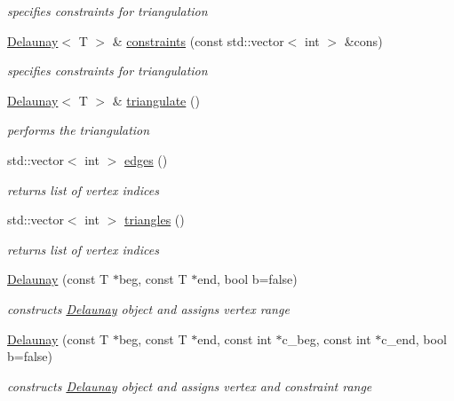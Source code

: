 \begin{DoxyCompactItemize}
\begin{DoxyCompactList}\small\item\em specifies constraints for triangulation \end{DoxyCompactList}\item 
\hyperlink{classDelaunay}{Delaunay}$<$ T $>$ \& \hyperlink{classDelaunay_a063efe9699418760aa756db7eaf554bf}{constraints} (const std\+::vector$<$ int $>$ \&cons)
\begin{DoxyCompactList}\small\item\em specifies constraints for triangulation \end{DoxyCompactList}\item 
\hyperlink{classDelaunay}{Delaunay}$<$ T $>$ \& \hyperlink{classDelaunay_a5f3b53cb70599e3bda45a4eedc7a68d5}{triangulate} ()
\begin{DoxyCompactList}\small\item\em performs the triangulation \end{DoxyCompactList}\item 
std\+::vector$<$ int $>$ \hyperlink{classDelaunay_ac9a4976cb0710e33009a3162361f2cc8}{edges} ()
\begin{DoxyCompactList}\small\item\em returns list of vertex indices \end{DoxyCompactList}\item 
std\+::vector$<$ int $>$ \hyperlink{classDelaunay_a1533d92a2ba20c15e3c28982aeb70992}{triangles} ()
\begin{DoxyCompactList}\small\item\em returns list of vertex indices \end{DoxyCompactList}\item 
\hyperlink{classDelaunay_a99e2fb8c6774b84fe85deb87191bc6f4}{Delaunay} (const T $\ast$beg, const T $\ast$end, bool b=false)
\begin{DoxyCompactList}\small\item\em constructs \hyperlink{classDelaunay}{Delaunay} object and assigns vertex range \end{DoxyCompactList}\item 
\hyperlink{classDelaunay_a22bd2799bb9541ea8e8f60be2c1b6a65}{Delaunay} (const T $\ast$beg, const T $\ast$end, const int $\ast$c\+\_\+beg, const int $\ast$c\+\_\+end, bool b=false)
\begin{DoxyCompactList}\small\item\em constructs \hyperlink{classDelaunay}{Delaunay} object and assigns vertex and constraint range \end{DoxyCompactList}\item 

\end{DoxyCompactItemize}
